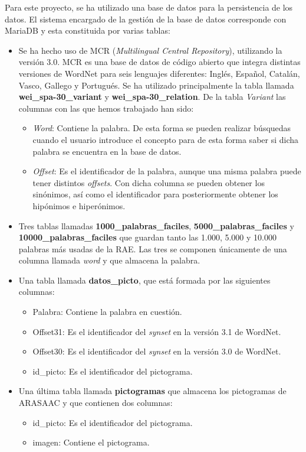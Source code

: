 Para este proyecto, se ha utilizado una base de datos para la persistencia de los datos. El sistema encargado de la gestión de la base de datos corresponde con MariaDB y esta constituida por varias tablas:
\begin{itemize}
	\item Se ha hecho uso de MCR (\textit{Multilingual Central Repository}), utilizando la versión 3.0. 
	MCR es una base de datos de código abierto que integra distintas versiones de WordNet para seis lenguajes diferentes: Inglés, Español, Catalán, Vasco, Gallego y Portugués. Se ha utilizado principalmente la tabla llamada \textbf{wei\_spa-30\_variant} y \textbf{wei\_spa-30\_relation}. De la tabla \textit{Variant} las columnas con las que hemos trabajado han sido:
	\begin{itemize}
		\item \textit{Word}: Contiene la palabra. De esta forma se pueden realizar búsquedas cuando el usuario introduce el concepto para de esta forma saber si dicha palabra se encuentra en la base de datos.
		\item \textit{Offset}: Es el identificador de la palabra, aunque una misma palabra puede tener distintos \textit{offsets}. Con dicha columna se pueden obtener los sinónimos, así como el identificador para posteriormente obtener los hipónimos e hiperónimos.
	\end{itemize}
	\item Tres tablas llamadas \textbf{1000\_palabras\_faciles}, \textbf{5000\_palabras\_faciles} y \textbf{10000\_palabras\_faciles} que guardan tanto las 1.000, 5.000 y 10.000 palabras más usadas de la RAE. Las tres se componen únicamente de una columna llamada \textit{word} y que almacena la palabra.
	\item Una tabla llamada \textbf{datos\_picto}, que está formada por las siguientes columnas:
	\begin{itemize}
		\item Palabra: Contiene la palabra en cuestión. 
		\item Offset31: Es el identificador del \textit{synset} en la versión 3.1 de WordNet.
		\item Offset30: Es el identificador del \textit{synset} en la versión 3.0 de WordNet.
		\item id\_picto: Es el identificador del pictograma.
	\end{itemize}
	\item Una última tabla llamada \textbf{pictogramas} que almacena los pictogramas de ARASAAC y que contienen dos columnas: 
	\begin{itemize}
		\item id\_picto: Es el identificador del pictograma.
		\item imagen: Contiene el pictograma.
	\end{itemize}
	
\end{itemize}



